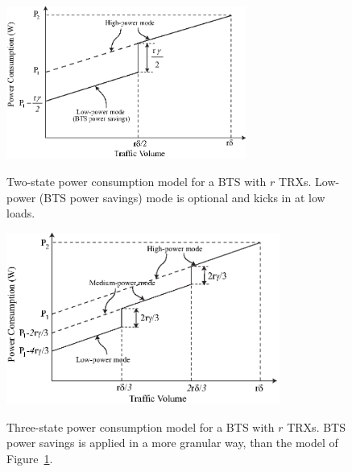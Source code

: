 \begin{figure}
\centering
\includegraphics[width=0.7\textwidth]{pics/ilyas4a.eps}
\label{fig:powermodel1}
\caption{Two-state power consumption model for a BTS with $r$ TRXs. Low-power (BTS power savings) mode is optional and kicks in at low loads.}
\end{figure}

\begin{figure}
\centering
\includegraphics[width=0.8\textwidth]{pics/ilyas4b.eps}
\label{fig:powermodel2}
\caption{Three-state power consumption model for a BTS with $r$ TRXs. BTS power savings is applied in a more granular way, than the model of Figure~\ref{fig:powermodel1}.}
\end{figure}

